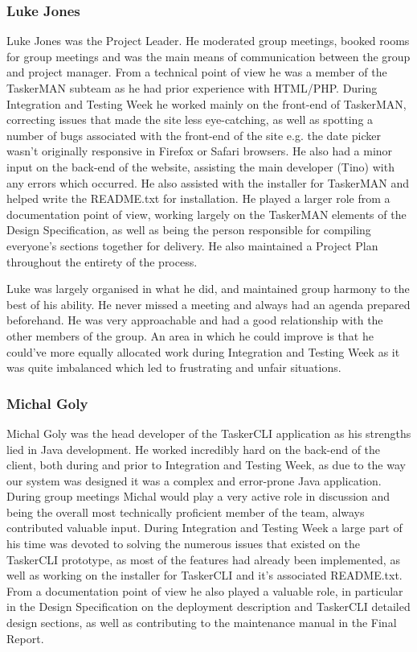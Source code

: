 \documentclass{project}
\begin{document}
\subsubsection{Luke Jones}
Luke Jones was the Project Leader. He moderated group meetings, booked rooms for group meetings and was the main means of communication between the group and project manager. From a technical point of view he was a member of the TaskerMAN subteam as he had prior experience with HTML/PHP. During Integration and Testing Week he worked mainly on the front-end of TaskerMAN, correcting issues that made the site less eye-catching, as well as spotting a number of bugs associated with the front-end of the site e.g. the date picker wasn't originally responsive in Firefox or Safari browsers. He also had a minor input on the back-end of the website, assisting the main developer (Tino) with any errors which occurred. He also assisted with the installer for TaskerMAN and helped write the README.txt for installation. He played a larger role from a documentation point of view, working largely on the TaskerMAN elements of the Design Specification, as well as being the person responsible for compiling everyone's sections together for delivery. He also maintained a Project Plan throughout the entirety of the process.

Luke was largely organised in what he did, and maintained group harmony to the best of his ability. He never missed a meeting and always had an agenda prepared beforehand. He was very approachable and had a good relationship with the other members of the group. An area in which he could improve is that he could've more equally allocated work during Integration and Testing Week as it was quite imbalanced which led to frustrating and unfair situations.
\subsubsection{Michal Goly}
Michal Goly was the head developer of the TaskerCLI application as his strengths lied in Java development. He worked incredibly hard on the back-end of the client, both during and prior to Integration and Testing Week, as due to the way our system was designed\cite{se.qa.ds} it was a complex and error-prone Java application. During group meetings Michal would play a very active role in discussion and being the overall most technically proficient member of the team, always contributed valuable input. During Integration and Testing Week a large part of his time was devoted to solving the numerous issues that existed on the TaskerCLI prototype, as most of the features had already been implemented, as well as working on the installer for TaskerCLI and it's associated README.txt. From a documentation point of view he also played a valuable role, in particular in the Design Specification on the deployment description and TaskerCLI detailed design sections, as well as contributing to the maintenance manual in the Final Report.
\end{document}
